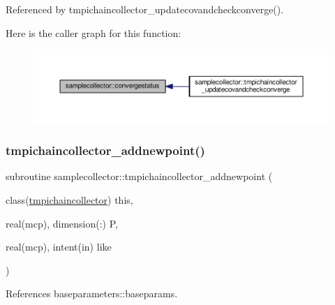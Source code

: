 Referenced by tmpichaincollector\+\_\+updatecovandcheckconverge().

Here is the caller graph for this function\+:
\nopagebreak
\begin{figure}[H]
\begin{center}
\leavevmode
\includegraphics[width=350pt]{namespacesamplecollector_aedac586422a605cbd11d9c0892242684_icgraph}
\end{center}
\end{figure}
\mbox{\label{namespacesamplecollector_a30e39ef70fabba57b75d0ddea5f75e84}} 
\subsubsection{\texorpdfstring{tmpichaincollector\+\_\+addnewpoint()}{tmpichaincollector\_addnewpoint()}}
{\footnotesize\ttfamily subroutine samplecollector\+::tmpichaincollector\+\_\+addnewpoint (\begin{DoxyParamCaption}\item[{class(\mbox{\hyperlink{structsamplecollector_1_1tmpichaincollector}{tmpichaincollector}})}]{this,  }\item[{real(mcp), dimension(\+:)}]{P,  }\item[{real(mcp), intent(in)}]{like }\end{DoxyParamCaption})\hspace{0.3cm}{\ttfamily [private]}}



References baseparameters\+::baseparams.

\mbox{\label{namespacesamplecollector_ac96bef33ce0ce505eee01406eafe5149}} 
